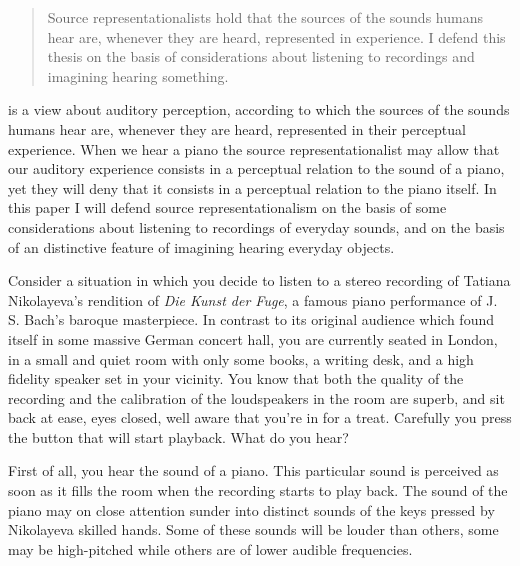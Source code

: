 \documentclass[sloppy, journal, git, bytitle, dodraft]{humapap}
\begin{document}
\documenttitle

\begin{abstract}
Source representationalists hold that the sources of the sounds humans hear are, whenever they are heard, represented in experience. I defend this thesis on the basis of considerations about listening to recordings and imagining hearing something. 
\end{abstract}
	
	
	
	

 is a view about auditory perception, according to which the sources of the sounds humans hear are, whenever they are heard, represented in their perceptual experience. When we hear a piano the source representationalist may allow that our auditory experience consists in a perceptual relation to the sound of a piano, yet they will deny that it consists in a perceptual relation to the piano itself. In this paper I will defend source representationalism on the basis of some considerations about listening to recordings of everyday sounds, and on the basis of an distinctive feature of imagining hearing everyday objects.

\sect Consider a situation in which you decide to listen to a stereo recording of Tatiana Nikolayeva's rendition of \emph{Die Kunst der Fuge}, a famous piano performance of J. S. Bach's baroque masterpiece. In contrast to its original audience which found itself in some massive German concert hall, you are currently seated in London, in a small and quiet room with only some books, a writing desk, and a high fidelity speaker set in your vicinity. You know that both the quality of the recording and the calibration of the loudspeakers in the room are superb, and sit back at ease, eyes closed, well aware that you're in for a treat. Carefully you press the button that will start playback. What do you hear? 

First of all, you hear the sound of a piano. This particular sound is perceived as soon as it fills the room when the recording starts to play back. The sound of the piano may on close attention sunder into distinct sounds of the keys pressed by Nikolayeva skilled hands. Some of these sounds will be louder than others, some may be high-pitched while others are  of lower audible frequencies.
\end{document}
